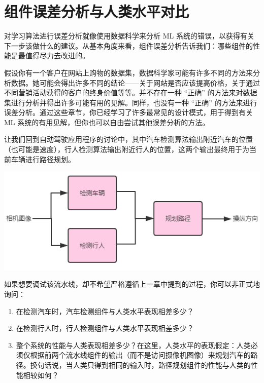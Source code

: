 \hypertarget{ux7ec4ux4ef6ux8befux5deeux5206ux6790ux4e0eux4ebaux7c7bux6c34ux5e73ux5bf9ux6bd4}{%
\chapter{组件误差分析与人类水平对比}\label{ux7ec4ux4ef6ux8befux5deeux5206ux6790ux4e0eux4ebaux7c7bux6c34ux5e73ux5bf9ux6bd4}}

对学习算法进行误差分析就像使用数据科学来分析 ML
系统的错误，以获得有关下一步该做什么的建议。从基本角度来看，组件误差分析告诉我们：哪些组件的性能是最值得尽力去改进的。

假设你有一个客户在网站上购物的数据集，数据科学家可能有许多不同的方法来分析数据。她可能会得出许多不同的结论------关于网站是否应该提高价格，关于通过不同营销活动获得的客户的终身价值等等。并不存在一种
``正确''
的方法来对数据集进行分析并得出许多可能有用的见解。同样，也没有一种
``正确''
的方法来进行误差分析。通过这些章节，你已经学习了许多最常见的设计模式，用于得到有关
ML 系统的有用见解，但你也可以自由尝试其他误差分析的方法。

让我们回到自动驾驶应用程序的讨论中，其中汽车检测算法输出附近汽车的位置（也可能是速度），行人检测算法输出附近行人的位置，这两个输出最终用于为当前车辆进行路径规划。

\includegraphics{./img/ch48_03.png}

如果想要调试该流水线，却不希望严格遵循上一章中提到的过程，你可以非正式地询问：

\begin{enumerate}
\def\labelenumi{\arabic{enumi}.}
\tightlist
\item
  在检测汽车时，汽车检测组件与人类水平表现相差多少？
\item
  在检测行人时，行人检测组件与人类水平表现相差多少？
\item
  整个系统的性能与人类表现相差多少？在这里，人类水平的表现假定：人类必须仅根据前两个流水线组件的输出（而不是访问摄像机图像）来规划汽车的路径。换句话说，当人类只得到相同的输入时，路径规划组件的性能与人类的性能相较如何？
\end{enumerate}

